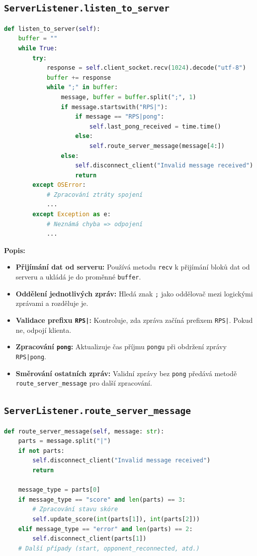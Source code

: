 \documentclass[12pt, a4paper]{article}
\begin{document}
\subsection{\texttt{ServerListener.listen\_to\_server}}
\begin{lstlisting}[language=Python, caption={Naslouchání zprávám od serveru}]
def listen_to_server(self):
    buffer = ""
    while True:
        try:
            response = self.client_socket.recv(1024).decode("utf-8")
            buffer += response
            while ";" in buffer:
                message, buffer = buffer.split(";", 1)
                if message.startswith("RPS|"):
                    if message == "RPS|pong":
                        self.last_pong_received = time.time()
                    else:
                        self.route_server_message(message[4:])
                else:
                    self.disconnect_client("Invalid message received")
                    return
        except OSError:
            # Zpracování ztráty spojení
            ...
        except Exception as e:
            # Neznámá chyba => odpojení
            ...
\end{lstlisting}

\noindent
\textbf{Popis:}
\begin{itemize}
    \item \textbf{Přijímání dat od serveru:} Používá metodu \texttt{recv} k přijímání bloků dat od serveru a ukládá je do proměnné \texttt{buffer}.
    \item \textbf{Oddělení jednotlivých zpráv:} Hledá znak \texttt{;} jako oddělovač mezi logickými zprávami a rozděluje je.
    \item \textbf{Validace prefixu \texttt{RPS|}:} Kontroluje, zda zpráva začíná prefixem \texttt{RPS|}. Pokud ne, odpojí klienta.
    \item \textbf{Zpracování \texttt{pong}:} Aktualizuje čas příjmu \texttt{pongu} při obdržení zprávy \texttt{RPS|pong}.
    \item \textbf{Směrování ostatních zpráv:} Validní zprávy bez \texttt{pong} předává metodě \texttt{route\_server\_message} pro další zpracování.
\end{itemize}

\subsection{\texttt{ServerListener.route\_server\_message}}

\begin{lstlisting}[language=Python, caption={Směrování routování zpráv podle typu}]
def route_server_message(self, message: str):
    parts = message.split("|")
    if not parts:
        self.disconnect_client("Invalid message received")
        return

    message_type = parts[0]
    if message_type == "score" and len(parts) == 3:
        # Zpracování stavu skóre
        self.update_score(int(parts[1]), int(parts[2]))
    elif message_type == "error" and len(parts) == 2:
        self.disconnect_client(parts[1])
    # Další případy (start, opponent_reconnected, atd.)
\end{lstlisting}
\end{document}
